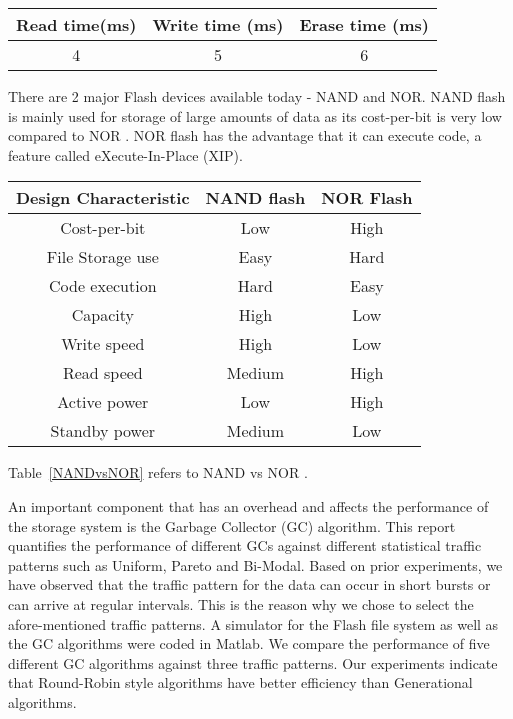 \documentclass[11pt]{report} %
\begin{document}
\begin{center}
   \begin{tabular} {|  c | c | c | }
       \hline
	Read time(ms) & Write time (ms) & Erase time (ms) \\ \hline
	4 & 5 & 6 \\ 
       \hline
   \end{tabular}
\end{center}

There are 2 major Flash devices available today - NAND and NOR. NAND flash is mainly used for storage of large amounts of data as its cost-per-bit is very low compared to NOR \cite{Toshiba}. NOR flash has the advantage that it can execute code, a feature called eXecute-In-Place (XIP).

\begin{center}
 \label{NANDvsNOR}
   \begin{tabular} {|  c | c | c | }
       \hline
	{\bf Design Characteristic} & {\bf NAND flash} & {\bf NOR Flash} \\ \hline
	Cost-per-bit & Low & High \\ \hline
	File Storage use & Easy & Hard \\ \hline
	Code execution & Hard & Easy\\ \hline
	Capacity & High & Low\\ \hline
	Write speed & High & Low\\ \hline
	Read speed & Medium & High\\ \hline
	Active power & Low & High\\ \hline
	Standby power & Medium & Low\\
       \hline
   \end{tabular}
\end{center}

Table~\ref{NANDvsNOR} refers to NAND vs NOR \cite{Toshiba}.

An important component that has an overhead and affects the performance of the storage system is the Garbage Collector (GC) algorithm. This report quantifies the performance of different GCs against different statistical traffic patterns such as Uniform, Pareto and Bi-Modal. Based on prior experiments, we have observed that the traffic pattern for the data can occur in short bursts or can arrive at regular intervals. This is the reason why we chose to select the afore-mentioned traffic patterns. A simulator for the Flash file system as well as the GC algorithms were coded in Matlab. We compare the performance of five different GC algorithms against three traffic patterns. Our experiments indicate that Round-Robin style algorithms have better efficiency than Generational algorithms.\\
\end{document}
